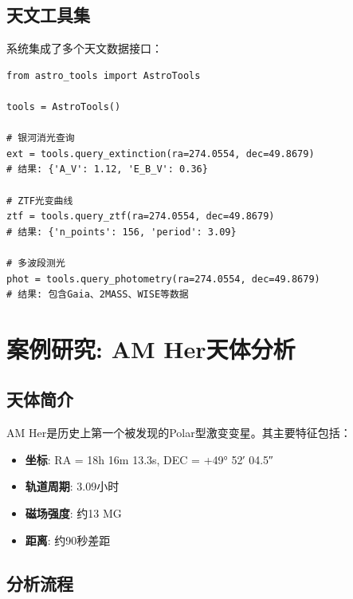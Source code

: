 \documentclass[a4paper,11pt]{article}
\begin{document}
\subsection{天文工具集}

系统集成了多个天文数据接口：

\begin{lstlisting}[caption={工具集使用示例}]
from astro_tools import AstroTools

tools = AstroTools()

# 银河消光查询
ext = tools.query_extinction(ra=274.0554, dec=49.8679)
# 结果: {'A_V': 1.12, 'E_B_V': 0.36}

# ZTF光变曲线
ztf = tools.query_ztf(ra=274.0554, dec=49.8679)
# 结果: {'n_points': 156, 'period': 3.09}

# 多波段测光
phot = tools.query_photometry(ra=274.0554, dec=49.8679)
# 结果: 包含Gaia、2MASS、WISE等数据
\end{lstlisting}

\section{案例研究: AM Her天体分析}

\subsection{天体简介}

AM Her是历史上第一个被发现的Polar型激变变星\cite{patterson1979}。其主要特征包括：

\begin{itemize}
    \item \textbf{坐标}: RA = 18h 16m 13.3s, DEC = +49° 52′ 04.5″
    \item \textbf{轨道周期}: 3.09小时
    \item \textbf{磁场强度}: 约13 MG
    \item \textbf{距离}: 约90秒差距
\end{itemize}

\subsection{分析流程}
\end{document}
